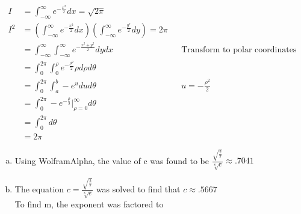 \documentclass[12pt]{article}
\newenvironment{problem}[2][Problem]{\begin{trivlist}
\item[\hskip \labelsep {\bfseries #1}\hskip \labelsep {\bfseries #2.}]
  \vspace{1 cm}
}{\end{trivlist}}
\begin{document}
\begin{problem}{3.19}
\item %
  \begin{align*}
    I &= \int_{-\infty}^{\infty} e^{-\frac{x^2}{2}}dx = \sqrt{2\pi} \\
    I^2 &= \left(\int_{-\infty}^{\infty} e^{-\frac{x^2}{2}}dx \right)
    \left( \int_{-\infty}^{\infty} e^{-\frac{y^2}{2}}dy \right) = 2\pi \\
    &= \int_{-\infty}^{\infty} \int_{-\infty}^{\infty} e^{-\frac{x^2+y^2}{2}}dydx
    & & \textrm{Transform to polar coordinates} \\
    &= \int_{0}^{2\pi} \int_{0}^{\rho} e^{-\frac{\rho^2}{2}}\rho d\rho d\theta \\
    &= \int_{0}^{2\pi} \int_{a}^{b} -e^{u}du d\theta & & u = -\frac{\rho^2}{2} \\
    &= \int_{0}^{2\pi} -e^{-\frac{\rho}{2}} \big|_{\rho = 0}^{\infty} d\theta \\
    &= \int_{0}^{2\pi} d\theta \\
    &= 2\pi
  \end{align*}
\end{problem}

\begin{problem}{3.21} %
\item
  \begin{enumerate}[a.]
    \item %
      Using WolframAlpha\textsuperscript{\textregistered}, the value of c was found to be 
      $\frac{\sqrt{\frac{2}{\pi}}}{\sqrt[8]{e}} \approx .7041$
    \item %
      The equation $c = \frac{\sqrt{\frac{2}{\pi}}}{\sqrt[8]{e}}$ was solved to 
      find that $c \approx .5667$ \\ 
      To find m, the exponent was factored to
  \end{enumerate}
\end{problem}

\begin{problem}{3.23} %
\item
\end{problem}
\end{document}
